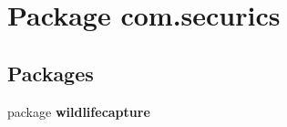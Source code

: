\section{Package com.\+securics}
\label{namespacecom_1_1securics}
\subsection*{Packages}
\begin{DoxyCompactItemize}
\item 
package {\bf wildlifecapture}
\end{DoxyCompactItemize}
